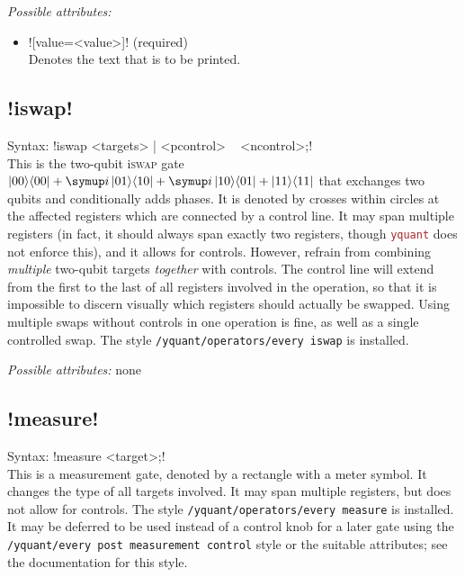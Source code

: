 \documentclass{scrartcl}
\def\pkg#1{\textcolor{brown}{\texttt{#1}}}
\def\ttlink{\link\texttt}
\def\Yquant{\pkg{yquant}}
\def\ii{{\symup i}}
\def\ketbra#1#2{\ket{#1}\!\bra{#2}}
\begin{document}
         \emph{Possible attributes:}
         \begin{itemize}
            \item \yquant![value=<value>]! (required) \\
               Denotes the text that is to be printed.
         \end{itemize}

      \subsection[\texorpdfstring{\yquant{iswap}}{iswap}]{\yquant!iswap!}
         Syntax: \yquant!iswap <targets> | <pcontrol> ~ <ncontrol>;! \\
         This is the two\hyp qubit i\textsc{swap} gate $\ketbra{00}{00} + \ii\ketbra{01}{10} + \ii\ketbra{10}{01} + \ketbra{11}{11}$ that exchanges two qubits and conditionally adds phases.
         It is denoted by crosses within circles at the affected registers which are connected by a control line.
         It may span multiple registers (in fact, it should always span exactly two registers, though \Yquant{} does not enforce this), and it allows for controls.
         However, refrain from combining \emph{multiple} two\hyp qubit targets \emph{together} with controls.
         The control line will extend from the first to the last of all registers involved in the operation, so that it is impossible to discern visually which registers should actually be swapped.
         Using multiple swaps without controls in one operation is fine, as well as a single controlled swap.
         The style \ttlink{/yquant/operators/every iswap} is installed.

         \emph{Possible attributes:} none

      \subsection[\texorpdfstring{\yquant{measure}}{measure}]{\yquant!measure!}
         Syntax: \yquant!measure <target>;! \\
         This is a measurement gate, denoted by a rectangle with a meter symbol.
         It changes the type of all targets involved.
         It may span multiple registers, but does not allow for controls.
         The style \ttlink{/yquant/operators/every measure} is installed.
         It may be deferred to be used instead of a control knob for a later gate using the \ttlink{/yquant/every post measurement control} style or the suitable attributes; see the documentation for this style.
\end{document}
